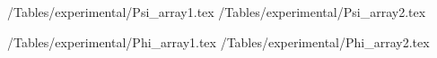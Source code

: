\begin{center}
	\econtexRoot/Tables/experimental/Psi_array1.tex	\econtexRoot/Tables/experimental/Psi_array2.tex
	\label{table:simulation_psi}
\end{center}

\begin{center}
	\econtexRoot/Tables/experimental/Phi_array1.tex	\econtexRoot/Tables/experimental/Phi_array2.tex
	\label{table:simulation_phi}
\end{center}

\begin{comment}
\begin{center}
	 \econtexRoot/Tables/experimental/sigmap_array1.tex	 \econtexRoot/Tables/experimental/sigmap_array2.tex
	\captionof{table}{Estimates of $\sigma_p$} \label{table:simulation_sigma_p}
\end{center}
\begin{center}
	 \econtexRoot/Tables/experimental/sigmaq_array1.tex	 \econtexRoot/Tables/experimental/sigmaq_array2.tex
	\captionof{table}{Estimates of $\sigma_q$} \label{table:simulation_sigma_q}
\end{center}
\end{comment}



